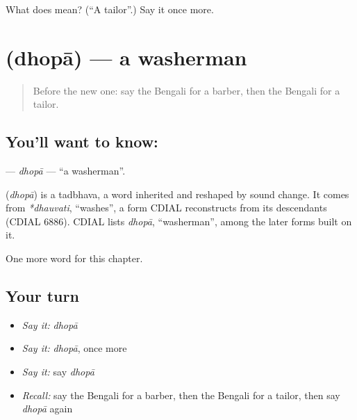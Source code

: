 \begin{tcolorbox}[breakable,colback=teal!4,colframe=teal!35!black,title={Before you move on}]
What does  mean? (\textquotedblleft{}A tailor\textquotedblright{}.) Say it once more.
\end{tcolorbox}
\section[\texorpdfstring{\bn{ধোপা} (dhopā)}{ধোপা (dhopā)}]{ (dhopā) — a washerman}

\label{lesson:BN-C126-dhopa}



\begin{quote}
Before the new one: say the Bengali for a barber, then the Bengali for a tailor.
\end{quote}

\subsection*{You'll want to know: }
\textbf{} — \emph{dhopā} — \textquotedblleft{}a washerman\textquotedblright{}.

\begin{cousinweb}
\textbf{} (\emph{dhopā}) is a tadbhava, a word inherited and reshaped by sound change. It comes from \emph{*dhauvati}, \textquotedblleft{}washes\textquotedblright{}, a form CDIAL reconstructs from its descendants (CDIAL 6886). CDIAL lists \emph{dhopā}, \textquotedblleft{}washerman\textquotedblright{}, among the later forms built on it.
\end{cousinweb}

\begin{grammarlens}[title={What you've built}]
One more word for this chapter.
\end{grammarlens}

\subsection*{Your turn}
\begin{itemize}
\raggedright
  \item \emph{Say it:} \emph{dhopā}
  \item \emph{Say it:} \emph{dhopā}, once more
  \item \emph{Say it:} say \emph{dhopā}
  \item \emph{Recall:} say the Bengali for a barber, then the Bengali for a tailor, then say \emph{dhopā} again
\end{itemize}

